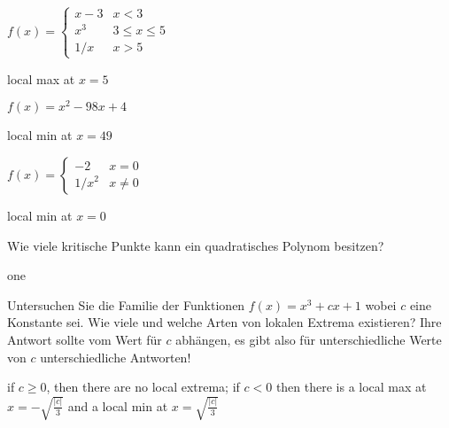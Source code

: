 \begin{exercises}
 \begin{exercise} $f(x) = \begin{cases} x-3 & x < 3  \\
x^3  & 3\leq x \leq 5 \\
1/x  & x>5 \end{cases}$
\begin{answer} local max at $x=5$
\end{answer}\end{exercise}

\begin{exercise} $f(x) = x^2 - 98x + 4$
\begin{answer} local min at $x=49$
\end{answer}\end{exercise}

\begin{exercise} $f(x) =\begin{cases} -2 & x = 0  \\
1/x^2 & x \neq 0 \end{cases}$
\begin{answer} local min at $x=0$
\end{answer}\end{exercise}

\endtwocol

\begin{exercise} Wie viele kritische Punkte kann ein quadratisches Polynom besitzen?
\begin{answer} one
\end{answer}\end{exercise}

\begin{exercise} Untersuchen Sie die Familie der Funktionen $f(x) = x^3 + cx +1$ wobei $c$ eine Konstante sei.
Wie viele und welche Arten von lokalen Extrema existieren? Ihre Antwort sollte vom Wert für $c$ abhängen, es gibt also für unterschiedliche Werte von $c$ unterschiedliche Antworten!

\begin{answer} if $c\ge 0$, then there are no local extrema; 
if $c<0$ then there is a local max at $x=-\sqrt{\frac{|c|}{3}}$ and a
local min at $x=\sqrt{\frac{|c|}{3}}$
\end{answer}\end{exercise}


\end{exercises}









